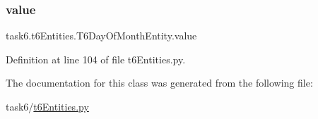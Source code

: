 \subsubsection{\texorpdfstring{value}{value}}
{\footnotesize\ttfamily task6.\+t6\+Entities.\+T6\+Day\+Of\+Month\+Entity.\+value}



Definition at line 104 of file t6\+Entities.\+py.



The documentation for this class was generated from the following file\+:\begin{DoxyCompactItemize}
\item 
task6/\hyperlink{t6Entities_8py}{t6\+Entities.\+py}\end{DoxyCompactItemize}
